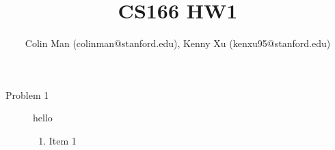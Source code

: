 \documentclass[11pt,oneside,a4paper]{article}
\begin{document}
\title{CS166 HW1}
\author{Colin Man (colinman@stanford.edu), Kenny Xu (kenxu95@stanford.edu)}

\maketitle

\begin{description}

\item[Problem 1]\noindent hello
  \begin{enumerate}[label=\alph*)]
  \item Item 1
  \end{enumerate}
\end{description}
\end{document}
